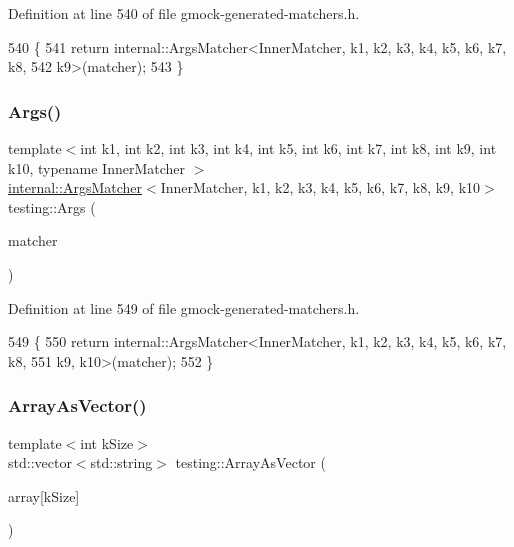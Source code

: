 Definition at line 540 of file gmock-\/generated-\/matchers.\+h.


\begin{DoxyCode}
540                                   \{
541   \textcolor{keywordflow}{return} internal::ArgsMatcher<InnerMatcher, k1, k2, k3, k4, k5, k6, k7, k8,
542       k9>(matcher);
543 \}
\end{DoxyCode}
\mbox{\label{namespacetesting_a09ac462e8d6ed468cbfaa9c767aee0aa}} 
\subsubsection{\texorpdfstring{Args()}{Args()}\hspace{0.1cm}{\footnotesize\ttfamily [11/11]}}
{\footnotesize\ttfamily template$<$int k1, int k2, int k3, int k4, int k5, int k6, int k7, int k8, int k9, int k10, typename Inner\+Matcher $>$ \\
\hyperlink{classtesting_1_1internal_1_1ArgsMatcher}{internal\+::\+Args\+Matcher}$<$Inner\+Matcher, k1, k2, k3, k4, k5, k6, k7, k8, k9, k10$>$ testing\+::\+Args (\begin{DoxyParamCaption}\item[{const Inner\+Matcher \&}]{matcher }\end{DoxyParamCaption})\hspace{0.3cm}{\ttfamily [inline]}}



Definition at line 549 of file gmock-\/generated-\/matchers.\+h.


\begin{DoxyCode}
549                                   \{
550   \textcolor{keywordflow}{return} internal::ArgsMatcher<InnerMatcher, k1, k2, k3, k4, k5, k6, k7, k8,
551       k9, k10>(matcher);
552 \}
\end{DoxyCode}
\mbox{\label{namespacetesting_a956d4c522454fa6dfd75b5bbbefe8f9e}} 
\subsubsection{\texorpdfstring{Array\+As\+Vector()}{ArrayAsVector()}}
{\footnotesize\ttfamily template$<$int k\+Size$>$ \\
std\+::vector$<$std\+::string$>$ testing\+::\+Array\+As\+Vector (\begin{DoxyParamCaption}\item[{const char $\ast$const (\&)}]{array\mbox{[}k\+Size\mbox{]} }\end{DoxyParamCaption})}



